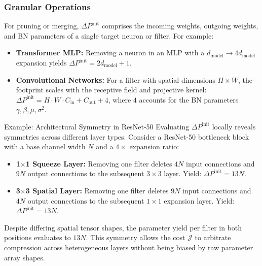 \documentclass[11pt, a4paper, copyright, gdm]{google}
\newcommand{\calJ}{\mathcal{J}}
\theoremstyle{definition}
\begin{document}
\subsubsection{Granular Operations}
For pruning or merging, $\Delta P^{\text{init}}$ comprises the incoming weights, outgoing weights, and BN parameters of a single target neuron or filter. For example:
\begin{itemize}
    \item \textbf{Transformer MLP:} Removing a neuron in an MLP with a $d_{\text{model}} \rightarrow 4d_{\text{model}}$ expansion yields $\Delta P^{\text{init}} = 2d_{\text{model}} + 1$.
    \item \textbf{Convolutional Networks:} For a filter with spatial dimensions $H \times W$, the footprint scales with the receptive field and projective kernel: $\Delta P^{\text{init}} = H \cdot W \cdot C_{\text{in}} + C_{\text{out}} + 4$, where $4$ accounts for the BN parameters $\gamma, \beta, \mu, \sigma^2$.
\end{itemize}

\begin{insight}{Example: Architectural Symmetry in ResNet-50}
Evaluating $\Delta P^{\text{init}}$ locally reveals symmetries across different layer types. Consider a ResNet-50 bottleneck block with a base channel width $N$ and a $4\times$ expansion ratio:
\begin{itemize}
    \item \textbf{1$\times$1 Squeeze Layer:} Removing one filter deletes $4N$ input connections and $9N$ output connections to the subsequent $3\times3$ layer. Yield: $\Delta P^{\text{init}} = 13N$.
    \item \textbf{3$\times$3 Spatial Layer:} Removing one filter deletes $9N$ input connections and $4N$ output connections to the subsequent $1\times1$ expansion layer. Yield: $\Delta P^{\text{init}} = 13N$.
\end{itemize}
Despite differing spatial tensor shapes, the parameter yield per filter in both positions evaluates to $13N$. This symmetry allows the cost $\calJ$ to arbitrate compression across heterogeneous layers without being biased by raw parameter array shapes.
\end{insight}
\end{document}
